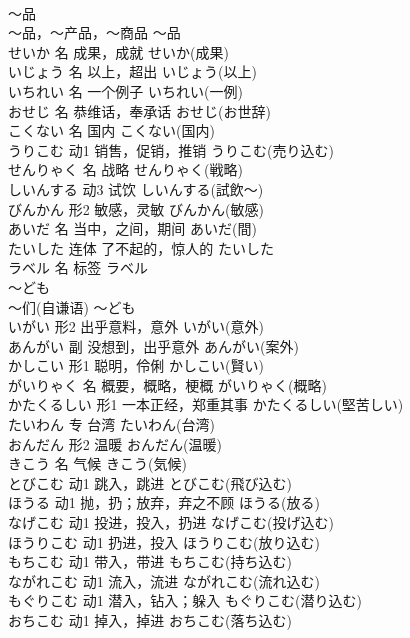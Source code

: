 \documentclass[8pt]{extreport}
\begin{document}
\begin{CJK}{UTF8}{min}
\\	～品	
\\	～品，～产品，～商品	～品	
\\	せいか	名	成果，成就	せいか(成果)	
\\	いじょう	名	以上，超出	いじょう(以上)	
\\	いちれい	名	一个例子	いちれい(一例)	
\\	おせじ	名	恭维话，奉承话	おせじ(お世辞)	
\\	こくない	名	国内	こくない(国内)	
\\	うりこむ	动1	销售，促销，推销	うりこむ(売り込む)	
\\	せんりゃく	名	战略	せんりゃく(戦略)	
\\	しいんする	动3	试饮	しいんする(試飲～)	
\\	びんかん	形2	敏感，灵敏	びんかん(敏感)	
\\	あいだ	名	当中，之间，期间	あいだ(間)	
\\	たいした	连体	了不起的，惊人的	たいした	
\\	ラベル	名	标签	ラベル	
\\	～ども	
\\	～们(自谦语)	～ども	
\\	いがい	形2	出乎意料，意外	いがい(意外)	
\\	あんがい	副	没想到，出乎意外	あんがい(案外)	
\\	かしこい	形1	聪明，伶俐	かしこい(賢い)	
\\	がいりゃく	名	概要，概略，梗概	がいりゃく(概略)	
\\	かたくるしい	形1	一本正经，郑重其事	かたくるしい(堅苦しい)	
\\	たいわん	专	台湾	たいわん(台湾)	
\\	おんだん	形2	温暖	おんだん(温暖)	
\\	きこう	名	气候	きこう(気候)	
\\	とびこむ	动1	跳入，跳进	とびこむ(飛び込む)	
\\	ほうる	动1	抛，扔；放弃，弃之不顾	ほうる(放る)	
\\	なげこむ	动1	投进，投入，扔进	なげこむ(投げ込む)	
\\	ほうりこむ	动1	扔进，投入	ほうりこむ(放り込む)	
\\	もちこむ	动1	带入，带进	もちこむ(持ち込む)	
\\	ながれこむ	动1	流入，流进	ながれこむ(流れ込む)	
\\	もぐりこむ	动1	潜入，钻入；躲入	もぐりこむ(潜り込む)	
\\	おちこむ	动1	掉入，掉进	おちこむ(落ち込む)	

\end{CJK}
\end{document}
